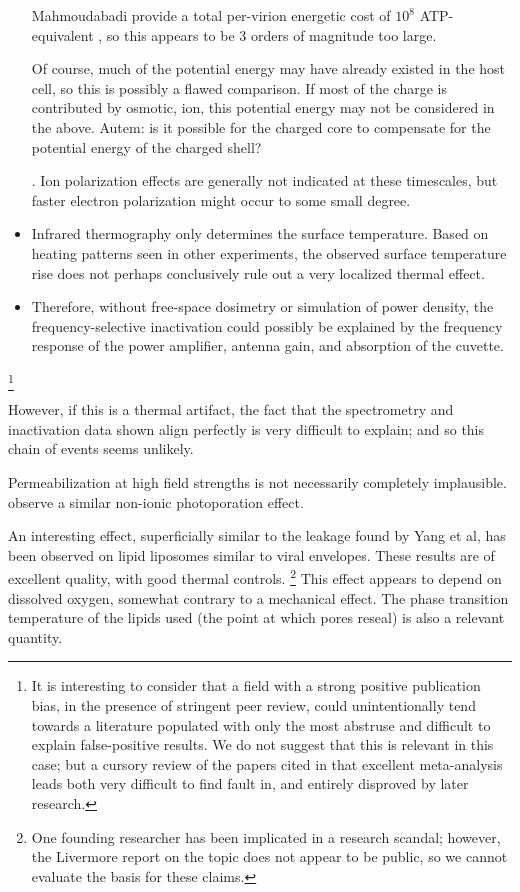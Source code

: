 \documentclass[paper.tex]{subfiles}
\begin{document}
\begin{multicols}{1}
\begin{itemize}
{		%
		
		Mahmoudabadi\cite{Energetic2017} provide a total per-virion energetic cost of $10^8 $ ATP-equivalent , so this appears to be 3 orders of magnitude too large.
		
		Of course, much of the potential energy may have already existed in the host cell, so this is possibly a flawed comparison. If most of the charge is contributed by osmotic, ion, this potential energy may not be considered in the above. Autem: is it possible for the charged core to compensate for the potential energy of the charged shell?}. Ion polarization effects are generally not indicated at these timescales\cite{ICNIRP2020}, but faster electron polarization might occur to some small degree. 
	
	
	
	
	\item Infrared thermography only determines the surface temperature. Based on heating patterns seen in other experiments\cite{Effects1950}, the observed surface temperature rise does not perhaps conclusively rule out a very localized thermal effect. 
	\item Therefore, without free-space dosimetry or simulation of power density, the frequency-selective inactivation could possibly be explained by the frequency response of the power amplifier, antenna gain, and absorption of the cuvette.
\end{itemize}

\footnote{It is interesting to consider that a field with a strong positive publication bias\cite{Comprehensive2018}, in the presence of stringent peer review, could unintentionally tend towards a literature populated with only the most abstruse and difficult to explain false-positive results. We do not suggest that this is relevant in this case; but a cursory review of the papers cited in that excellent meta-analysis leads both very difficult to find fault in, and entirely disproved by later research.}

However, if this is a thermal artifact, the fact that the spectrometry and inactivation data shown align perfectly is very difficult to explain; and so this chain of events seems unlikely.

Permeabilization at high field strengths is not necessarily completely implausible. \cite{182015} observe a similar non-ionic photoporation effect.

An interesting effect, superficially similar to the leakage found by Yang et al, has been observed on lipid liposomes similar to viral envelopes\cite{MicrowaveStimulated1985}\cite{Influence}\cite{Correlation1994}\cite{contribution2019}. These results are of excellent quality, with good thermal controls. \footnote{One founding researcher has been implicated in a research scandal; however, the Livermore report on the topic does not appear to be public, so we cannot evaluate the basis for these claims.} This effect appears to depend on dissolved oxygen\cite{Microwaves1987}\cite{Microwaves1988}, somewhat contrary to a mechanical effect. The phase transition temperature of the lipids used (the point at which pores reseal) is also a relevant quantity. 


\end{multicols}
\end{document}
